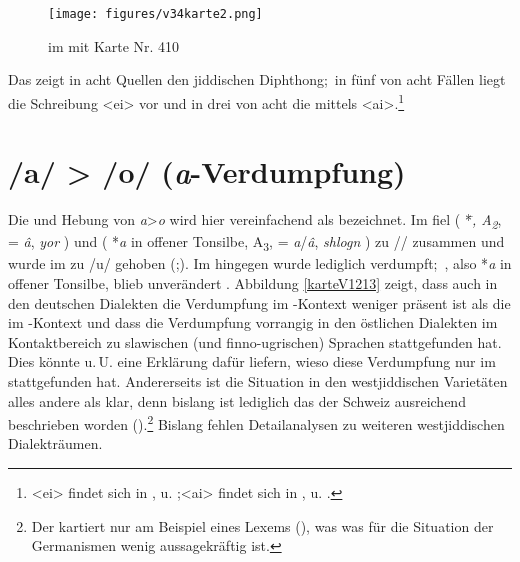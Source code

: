  
 \begin{figure}
		\centering
\texttt{[image: figures/v34karte2.png]}
		\caption{\label{karteV34}   im  mit  Karte Nr. 410}
		\end{figure}

 
 
\largerpage
 Das  zeigt in acht Quellen den jiddischen Diphthong;\, in fünf von acht Fällen liegt die Schreibung <ei> vor und in drei von acht die mittels <ai>.\footnote{<ei> findet sich in ,  u. ;<ai> findet sich in ,  u. .}\\
 
   \section{/a/ > /o/ (\textit{a}-Ver\-dumpf\-ung)}\label{phonV1213}

Die  und Hebung von \textit{a}>\textit{o} wird hier vereinfachend als  bezeichnet. Im \hai{{\OJ}} fiel  ({\urj} *\textit{\=\textopeno\textlengthmark, A\textsubscript{2}}, = {\mhd} \textit{â}, {\oj}  \textit{yor} ) und  ({\urj} *\textit{a} in offener Tonsilbe,  A\textsubscript{3}, = {\mhd} \textit{a}/\textit{â}, {\oj}  \textit{shlogn} ) zu /\textopeno\textlengthmark/ zusammen und wurde im \hai{{\ZOJ}} zu /u\textlengthmark/ gehoben (\citealt[93–121]{Timm1987};\citealt[186f]{Bin-Nun1973}). Im \hai{{\WJ}} hingegen wurde lediglich  verdumpft;\, , also *\textit{a} in offener Tonsilbe, blieb unverändert \parencite{Beider2010}. Abbildung \ref{karteV1213} zeigt, dass auch in den deutschen Dialekten die Ver\-dumpf\-ung im -Kontext weniger präsent ist als die im -Kontext und dass die Verdumpfung vorrangig in den östlichen Dialekten im Kontaktbereich zu slawischen (und finno-ugrischen) Sprachen stattgefunden hat. Dies könnte u.\,U. eine Erklärung dafür liefern, wieso diese Verdumpfung nur im \hai{{\OJ}} stattgefunden hat. Andererseits ist die Situation in den westjiddischen Varietäten alles andere als klar, denn bislang ist lediglich das \hai{{\SWJ}} der Schweiz ausreichend beschrieben worden (\citealt{GuggenheimGruenberg1973,Beider2010}).\footnote{Der  kartiert  nur am Beispiel eines {\hebr} Lexems (\citealt[68]{Herzog1992}), was was für die Situation der Germanismen wenig aussagekräftig ist.} 
Bislang fehlen Detailanalysen zu weiteren westjiddischen Dialekträumen.

